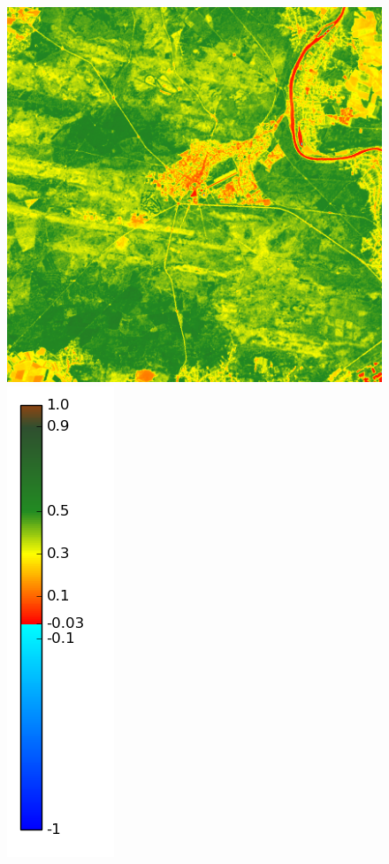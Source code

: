 \documentclass{book}
\begin{document}
\begin{figure}[H]
{\includegraphics[scale=0.25]{images/Fontainebleau/07_ndvi.png}
\includegraphics[scale=0.2]{images/colormap.png}
}
\centerline{
}
\end{figure}
\end{document}
